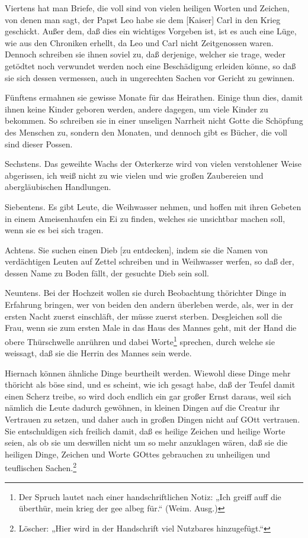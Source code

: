 Viertens hat man Briefe, die voll sind von vielen heiligen Worten und Zeichen, von denen man sagt, der Papst Leo habe sie dem [Kaiser] Carl in den Krieg geschickt. Außer dem, daß dies ein wichtiges Vorgeben ist, ist es auch eine Lüge, wie aus den Chroniken erhellt, da Leo und Carl nicht Zeitgenossen waren. Dennoch schreiben sie ihnen soviel zu, daß derjenige, welcher sie trage, weder getödtet noch verwundet werden noch eine Beschädigung erleiden könne, so daß sie sich dessen vermessen, auch in ungerechten Sachen vor Gericht zu gewinnen.

Fünftens ermahnen sie gewisse Monate für das Heirathen. Einige thun dies, damit ihnen keine Kinder geboren werden, andere dagegen, um viele Kinder zu bekommen. So schreiben sie in einer unseligen Narrheit nicht Gotte die Schöpfung des Menschen zu, sondern den Monaten, und dennoch gibt es Bücher, die voll sind dieser Possen.

Sechstens. Das geweihte Wachs der Osterkerze wird von vielen verstohlener Weise abgerissen, ich weiß nicht zu wie vielen und wie großen Zaubereien und abergläubischen Handlungen.

Siebentens. Es gibt Leute, die Weihwasser nehmen, und hoffen mit ihren Gebeten in einem Ameisenhaufen ein Ei zu finden, welches sie unsichtbar machen soll, wenn sie es bei sich tragen.

Achtens. Sie suchen einen Dieb [zu entdecken], indem sie die Namen von verdächtigen Leuten auf Zettel schreiben und in Weihwasser werfen, so daß der, dessen Name zu Boden fällt, der gesuchte Dieb sein soll.

Neuntens. Bei der Hochzeit wollen sie durch Beobachtung thörichter Dinge in Erfahrung bringen, wer von beiden den andern überleben werde, als, wer in der ersten Nacht zuerst einschläft, der müsse zuerst sterben. Desgleichen soll die Frau, wenn sie zum ersten Male in das Haus des Mannes geht, mit der Hand die obere Thürschwelle anrühren und dabei Worte\footnote{Der Spruch lautet nach einer handschriftlichen Notiz: „Ich greiff auff die überthür, mein krieg der gee albeg für.“ (Weim. Ausg.)} sprechen, durch welche sie weissagt, daß sie die Herrin des Mannes sein werde.

Hiernach können ähnliche Dinge beurtheilt werden. Wiewohl diese Dinge mehr thöricht als böse sind, und es scheint, wie ich gesagt habe, daß der Teufel damit einen Scherz treibe, so wird doch endlich ein gar großer Ernst daraus, weil sich nämlich die Leute dadurch gewöhnen, in kleinen Dingen auf die Creatur ihr Vertrauen zu setzen, und daher auch in großen Dingen nicht auf GOtt vertrauen. Sie entschuldigen sich freilich damit, daß es heilige Zeichen und heilige Worte seien, als ob sie um deswillen nicht um so mehr anzuklagen wären, daß sie die heiligen Dinge, Zeichen und Worte GOttes gebrauchen zu unheiligen und teuflischen Sachen.\footnote{Löscher: „Hier wird in der Handschrift viel Nutzbares hinzugefügt.“}

